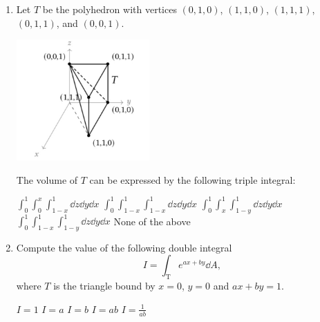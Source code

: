 \documentclass[12pt]{exam}
\begin{document}
\begin{enumerate}
\item Let $T$ be the polyhedron with vertices $(0,1,0)$, $(1,1,0)$, $(1,1,1)$, $(0,1,1)$, and $(0,0,1)$.  
\begin{center}
    \includegraphics[width=0.4\textwidth]{fig1.png}
\end{center}
The volume of $T$ can be expressed by the following triple integral:
\begin{checkboxes}
    \choice $\displaystyle \int_0^1 \int_0^x \int_{1-x}^1 \dd z\dd y\dd x$
    \choice $\displaystyle \int_0^1 \int_{1-x}^1 \int_{1-x}^1 \dd z\dd y\dd x$
    \choice $\displaystyle \int_0^1 \int_{x}^1 \int_{1-y}^1 \dd z\dd y\dd x$
    \choice $\displaystyle \int_0^1 \int_{1-x}^1 \int_{1-y}^1 \dd z\dd y\dd x$
    \choice None of the above
\end{checkboxes}

\item Compute the value of the following double integral
$$I=\int_{\text{T}}e^{ax+by}\dd A,$$
where $T$ is the triangle bound by $x=0$, $y=0$ and $ax+by=1$.
\begin{checkboxes}
    \choice $I=1$
    \choice $I=a$
    \choice $I=b$
    \choice $I=ab$
    \choice $I=\frac{1}{ab}$
\end{checkboxes}
\end{enumerate}
\end{document}
